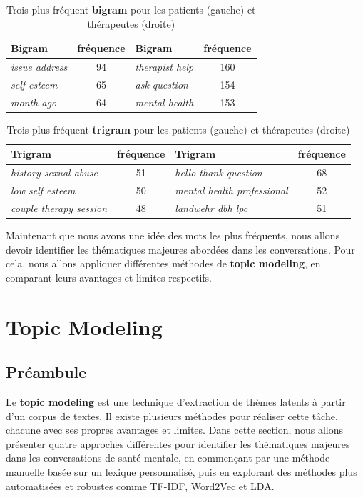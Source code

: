 \documentclass[12pt,a4paper]{report}
\begin{document}
\vspace{10px}

\begin{table}[h]
\centering
\begin{tabularx}{0.65\textwidth}{lc||lc}
\toprule
\textbf{Bigram} & \textbf{fréquence} & \textbf{Bigram} & \textbf{fréquence}\\
\midrule
\textit{issue address} & 94 & \textit{therapist help} & 160\\
\textit{self esteem} & 65 & \textit{ask question} & 154\\
\textit{month ago} & 64 & \textit{mental health} & 153\\
\bottomrule
\end{tabularx}
\caption{Trois plus fréquent \textbf{bigram} pour les patients (gauche) et thérapeutes (droite)}
\end{table}

\vspace{10px}

\begin{table}[h]
\centering
\begin{tabularx}{0.9\textwidth}{lc||lc}
\toprule
\textbf{Trigram} & \textbf{fréquence} & \textbf{Trigram} & \textbf{fréquence}\\
\midrule
\textit{history sexual abuse} & 51 & \textit{hello thank question} & 68\\
\textit{low self esteem} & 50 & \textit{mental health professional} & 52\\
\textit{couple therapy session} & 48 & \textit{landwehr dbh lpc} & 51\\
\bottomrule
\end{tabularx}
\caption{Trois plus fréquent \textbf{trigram} pour les patients (gauche) et thérapeutes (droite)}
\end{table}

\bigskip

Maintenant que nous avons une idée des mots les plus fréquents, nous allons devoir identifier
les thématiques majeures abordées dans les conversations.
Pour cela, nous allons appliquer différentes méthodes de \textbf{topic modeling}, en comparant leurs avantages et limites respectifs.

\pagebreak

\chapter{Topic Modeling}\label{chap:topic_modeling}

\section{Préambule}
Le \textbf{topic modeling} est une technique d'extraction de thèmes latents à partir d'un corpus de textes.
Il existe plusieurs méthodes pour réaliser cette tâche, chacune avec ses propres avantages et limites.
Dans cette section, nous allons présenter quatre approches différentes pour identifier les thématiques majeures dans les conversations de santé mentale, 
en commençant par une méthode manuelle basée sur un lexique personnalisé, puis en explorant des méthodes plus automatisées et robustes comme TF-IDF, Word2Vec et LDA.
\end{document}
